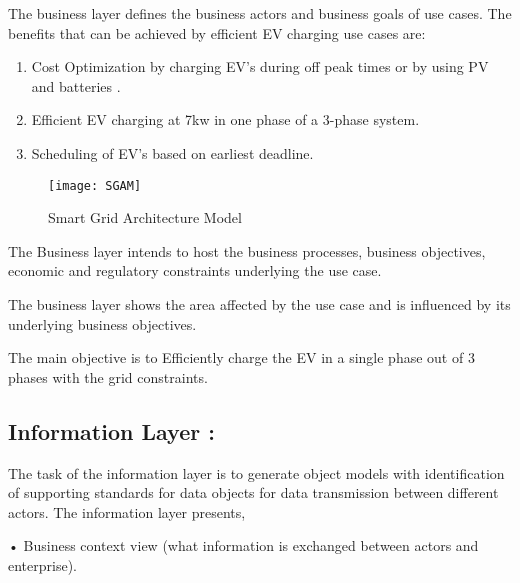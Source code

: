 The business layer defines the business actors and business goals of use cases. The benefits that can be achieved by efficient EV charging use cases are: 
\begin{enumerate} 
\item Cost Optimization by charging EV's during off peak times or by using PV and batteries .  
\item Efficient EV charging at 7kw in one phase of a 3-phase system. 
\item Scheduling of EV’s based on earliest deadline.
\end{enumerate}
\clearpage
\begin{figure}[h]
	\centering
	\texttt{[image: SGAM]}
	\caption{Smart Grid Architecture Model }
	\label{fig:Smart Grid Architecture Model }
\end{figure}
The Business layer intends to host the business processes, business objectives, economic and regulatory constraints underlying the use case. 
 
The business layer shows the area affected by the use case and is influenced by its underlying business objectives. 
 
The main objective is to Efficiently charge the EV in a single phase out of 3 phases with the grid constraints.

\subsection{Information Layer :}

The task of the information layer is to generate object models with identification of supporting standards for data objects for data transmission between different actors. The information layer presents, 
 
• Business context view (what information is exchanged between actors and enterprise).  
 
